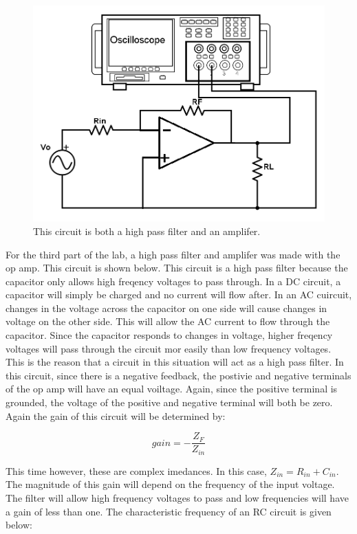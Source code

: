 \documentclass[twocolumn, amsmath]{revtex4}
\begin{document}
\begin{figure}[h]
    \includegraphics[scale=0.4]{inverting.png}  
    \caption{This circuit is both a high pass filter and an amplifer.}
\end{figure}

For the third part of the lab, a high pass filter and amplifer was made with the op amp. This circuit is shown below. This circuit is a high pass filter because the capacitor only allows high freqency voltages to pass through. In a DC circuit, a capacitor will simply be charged and no current will flow after. In an AC cuircuit, changes in the voltage across the capacitor on one side will cause changes in voltage on the other side. This will allow the AC current to flow through the capacitor. Since the capacitor responds to changes in voltage, higher freqency voltages will pass through the circuit mor easily than low frequency voltages. This is the reason that a circuit in this situation will act as a high pass filter. In this circuit, since there is a negative feedback, the postivie and negative terminals of the op amp will have an equal voiltage. Again, since the positive terminal is grounded, the voltage of the positive and negative terminal will both be zero. Again the gain of this circuit will be determined by:

\begin{equation}
gain =  -\frac{Z_{F}}{Z_{in}}
\end{equation}

This time however, these are complex imedances. In this case, $Z_{in} = R_{in} + C_{in}$. The magnitude of this gain will depend on the frequency of the input voltage. The filter will allow high frequency voltages to pass and low frequencies will have a gain of less than one. The characteristic frequency of an RC circuit is given below:
\end{document}
